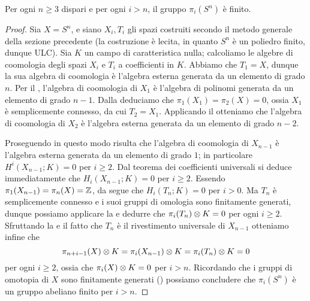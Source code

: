 \begin{proposition}
Per ogni $n\ge 3$ dispari e per ogni $i>n$, il gruppo $\pi_i(S^n)$ è finito.
\end{proposition}
\begin{proof}
Sia $X=S^n$, e siano $X_i,T_i$ gli spazi costruiti secondo il metodo generale della sezione precedente (la costruzione è lecita, in quanto $S^n$ è un poliedro finito, dunque ULC). Sia $K$ un campo di caratteristica nulla; calcoliamo le algebre di coomologia degli spazi $X_i$ e $T_i$ a coefficienti in $K$. Abbiamo che $T_1=X$, dunque la sua algebra di coomologia è l'algebra esterna generata da un elemento di grado $n$. Per il , l'algebra di coomologia di $X_1$ è l'algebra di polinomi generata da un elemento di grado $n-1$. Dalla  deduciamo che $\pi_1(X_1)=\pi_2(X)=0$, ossia $X_1$ è semplicemente connesso, da cui $T_2=X_1$. Applicando il  otteniamo che l'algebra di coomologia di $X_2$ è l'algebra esterna generata da un elemento di grado $n-2$.

Proseguendo in questo modo risulta che l'algebra di coomologia di $X_{n-1}$ è l'algebra esterna generata da un elemento di grado $1$; in particolare $H^i(X_{n-1};K)=0$ per $i\ge 2$. Dal teorema dei coefficienti universali si deduce immediatamente che $H_i(X_{n-1};K)=0$ per $i\ge 2$. Essendo $\pi_1(X_{n-1})=\pi_n(X)=\mathbb{Z}$, da \missing{} segue che $H_i(T_n;K)=0$ per $i>0$. Ma $T_n$ è semplicemente connesso e i suoi gruppi di omologia sono finitamente generati, dunque possiamo applicare la  e dedurre che $\pi_i(T_n)\mathbin{\otimes} K=0$ per ogni $i\ge 2$. Sfruttando la  e il fatto che $T_n$ è il rivestimento universale di $X_{n-1}$ otteniamo infine che 
$$
\pi_{n+i-1}(X)\mathbin{\otimes} K=\pi_i(X_{n-1})\mathbin{\otimes} K=\pi_i(T_n)\mathbin{\otimes} K=0
$$
per ogni $i\ge 2$, ossia che $\pi_i(X)\mathbin{\otimes} K=0$ per $i>n$. Ricordando che i gruppi di omotopia di $X$ sono finitamente generati () possiamo concludere che $\pi_i(S^n)$ è un gruppo abeliano finito per $i>n$.
\end{proof}